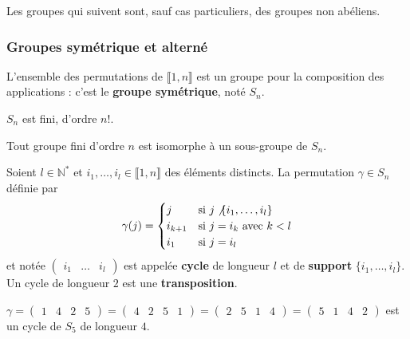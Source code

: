   Les groupes qui suivent sont, sauf cas particuliers, des groupes non abéliens.

  \subsubsection{Groupes symétrique et alterné}


  \begin{definition}
    L'ensemble des permutations de $\llbracket 1, n \rrbracket$ est un groupe pour la composition des applications : c'est le \textbf{groupe symétrique}, noté $S_n$.
  \end{definition}

  \begin{remark}
    $S_n$ est fini, d'ordre $n!$.
  \end{remark}

  \begin{theorem}[Cayley]
    Tout groupe fini d'ordre $n$ est isomorphe à un sous-groupe de $S_n$.
  \end{theorem}

  \begin{definition}
    Soient $l \in \mathbb{N}^*$ et $i_1, \dots, i_l \in \llbracket 1, n \rrbracket$ des éléments distincts. La permutation $\gamma \in S_n$ définie par
    \[
      \gamma(j) =
      \begin{cases}
        j &\text{si } j \not \{ i_1, \dots, i_l \} \\
        i_{k+1} &\text{si } j = i_k \text{ avec } k<l \\
        i_1 &\text{si } j=i_l
      \end{cases}
    \]
    et notée $\begin{pmatrix} i_1 & \dots & i_l \end{pmatrix}$ est appelée \textbf{cycle} de longueur $l$ et de \textbf{support} $\{ i_1, \dots, i_l \}$. Un cycle de longueur $2$ est une \textbf{transposition}.
  \end{definition}

  \begin{example}
    $\gamma = \begin{pmatrix} 1 & 4 & 2 & 5 \end{pmatrix} = \begin{pmatrix} 4 & 2 & 5 & 1 \end{pmatrix} = \begin{pmatrix} 2 & 5 & 1 & 4 \end{pmatrix} = \begin{pmatrix} 5 & 1 & 4 & 2 \end{pmatrix}$ est un cycle de $S_5$ de longueur $4$.
  \end{example}

